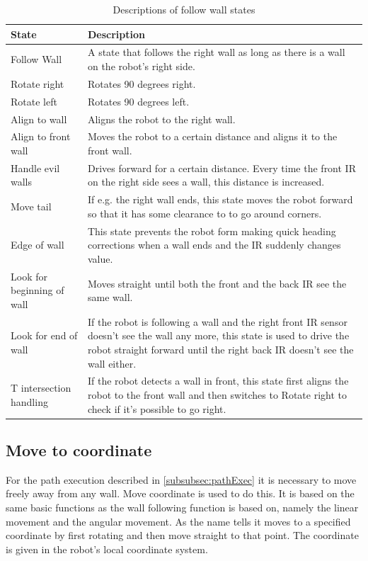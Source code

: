 \begin{table}[h!]
\centering
  \caption{Descriptions of follow wall states}
  \begin{tabular}{l|p{10cm}}
    \textbf{State} & \textbf{Description} \\ \hline
    Follow Wall & A state that follows the right wall as long as there is a wall on the robot’s right side. \\ \hline
    Rotate right & Rotates 90 degrees right. \\ \hline
    Rotate left & Rotates 90 degrees left. \\ \hline
    Align to wall & Aligns the robot to the right wall. \\ \hline
    Align to front wall & Moves the robot to a certain distance and aligns it to the front wall. \\ \hline
    Handle evil walls & Drives forward for a certain distance. Every time the front IR on the right side sees a wall, this distance is increased. \\ \hline
    Move tail & If e.g. the right wall ends, this state moves the robot forward so that it has some clearance to to go around corners. \\ \hline
    Edge of wall & This state prevents the robot form making quick heading corrections when a wall ends and the IR suddenly changes value. \\ \hline
    Look for beginning of wall & Moves straight until both the front and the back IR see the same wall.  \\ \hline
    Look for end of wall & If the robot is following a wall and the right front IR sensor doesn’t see the wall any more, this state is used to drive the robot straight forward until the right back IR doesn’t see the wall either. \\ \hline
    T intersection handling & If the robot detects a wall in front, this state first aligns the robot to the front wall and then switches to Rotate right to check if it’s possible to go right. \\ 
    \hline
  \end{tabular}
\normalsize
\label{tab:followWallStates}
\end{table}

\subsection{Move to coordinate}
For the path execution described in \ref{subsubsec:pathExec} it is necessary to move freely away from any wall. Move coordinate is used to do this. It is based on the same basic functions as the wall following function is based on, namely the linear movement and the angular movement. As the name tells it moves to a specified coordinate by first rotating and then move straight to that point. The coordinate is given in the robot's local coordinate system.

